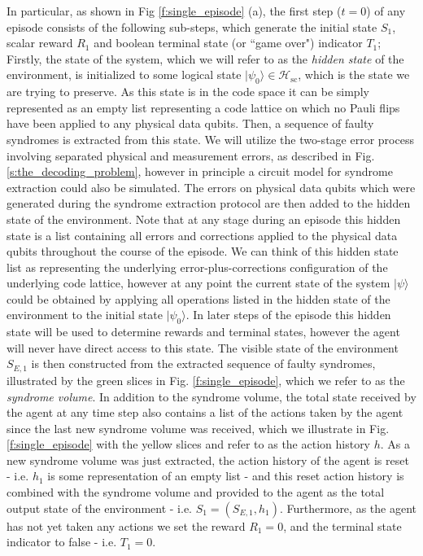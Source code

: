 \documentclass[twocolumn,preprintnumbers,amsmath,amssymb,notitlepage,nofootinbib,longbibliography,superscriptaddress,aps,pra,10pt]{revtex4-1}
\begin{document}
    In particular, as shown in Fig \ref{f:single_episode} (a), the first step ($t=0$) of any episode consists of the following sub-steps, which generate the initial state $S_1$, scalar reward $R_1$ and boolean terminal state (or ``game over") indicator $T_1$;
    Firstly, the state of the system, which we will refer to as the \textit{hidden state} of the environment, is initialized to some logical state $|\psi_0\rangle \in \mathcal{H_\mathrm{sc}}$, which is the state we are trying to preserve.
    As this state is in the code space it can be simply represented as an empty list representing a code lattice on which no Pauli flips have been applied to any physical data qubits.
    Then, a sequence of faulty syndromes is extracted from this state.
    We will utilize the two-stage error process involving separated physical and measurement errors, as described in Fig. \ref{s:the_decoding_problem}, however in principle a circuit model for syndrome extraction could also be simulated.
    The errors on physical data qubits which were generated during the syndrome extraction protocol are then added to the hidden state of the environment.
    Note that at any stage during an episode this hidden state is a list containing all errors and corrections applied to the physical data qubits throughout the course of the episode.
    We can think of this hidden state list as representing the underlying error-plus-corrections configuration of the underlying code lattice, however at any point the current state of the system $|\psi\rangle$ could be obtained by applying all operations listed in the hidden state of the environment to the initial state $|\psi_0\rangle$.
    In later steps of the episode this hidden state will be used to determine rewards and terminal states, however the agent will never have direct access to this state.
    The visible state of the environment $S_{E,1}$ is then constructed from the extracted sequence of faulty syndromes, illustrated by the green slices in Fig. \ref{f:single_episode}, which we refer to as the \textit {syndrome volume}.
    In addition to the syndrome volume, the total state received by the agent at any time step also contains a list of the actions taken by the agent since the last new syndrome volume was received, which we illustrate in Fig. \ref{f:single_episode} with the yellow slices and refer to as the action history $h$.
    As a new syndrome volume was just extracted, the action history of the agent is reset - i.e. $h_1$ is some representation of an empty list -  and this reset action history is combined with the syndrome volume and provided to the agent as the total output state of the environment - i.e. $S_1 = (S_{E,1},h_1)$.
    Furthermore, as the agent has not yet taken any actions we set the reward $R_1 =0$, and the terminal state indicator to false - i.e. $T_1=0$.
\end{document}
